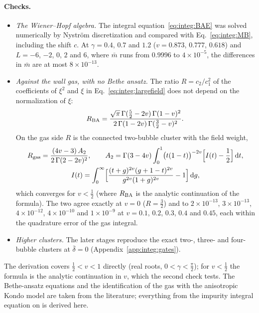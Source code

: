 \documentclass[11pt,a4paper]{article}
\numberwithin{equation}{section}
\newcommand{\dd}{\,\mathrm d}
\newcommand{\db}{\bar\delta}
\newcommand{\sci}[2]{#1\times10^{#2}}
\begin{document}
\paragraph{Checks.}
\begin{itemize}
\item \emph{The Wiener--Hopf algebra.} The integral equation~\eqref{eq:integ:BAE} was solved numerically by Nystr\"om
 discretization and compared with Eq.~\eqref{eq:integ:MB}, including the shift $c$. At $\gamma=0.4$, $0.7$ and $1.2$
 ($v=0.873$, $0.777$, $0.618$) and $L=-6$, $-2$, $0$, $2$ and $6$, where $\bar m$ runs from $0.9996$ to $\sci{4}{-5}$,
 the differences in $\bar m$ are at most $\sci{8}{-13}$.
\item \emph{Against the wall gas, with no Bethe ansatz.} The ratio $R=c_2/c_1^2$ of the coefficients of $\xi^2$ and
 $\xi$ in Eq.~\eqref{eq:integ:largefield} does not depend on the normalization of $\xi$:
 \begin{equation}
  R_{\rm BA}=\frac{\sqrt\pi\,\Gamma(\frac52-2v)\,\Gamma(1-v)^2}{2\,\Gamma(1-2v)\,\Gamma(\frac32-v)^2}.
 \end{equation}
 On the gas side $R$ is the connected two-bubble cluster with the field weight,
 \begin{equation}
 \begin{gathered}
  R_{\rm gas}=\frac{(4v-3)\,A_2}{2\,\Gamma(2-2v)^2},\qquad
  A_2=\Gamma(3-4v)\int_0^1\bigl(t(1-t)\bigr)^{-2v}\Bigl[I(t)-\frac12\Bigr]\dd t,\\
  I(t)=\int_0^\infty\Bigl[\frac{(t+g)^{2v}(g+1-t)^{2v}}{g^{2v}(1+g)^{2v}}-1\Bigr]\dd g,
 \end{gathered}
 \end{equation}
 which converges for $v<\frac12$ (where $R_{\rm BA}$ is the analytic continuation of the formula). The two agree
 exactly at $v=0$ ($R=\frac32$) and to $\sci{2}{-13}$, $\sci{3}{-13}$, $\sci{4}{-12}$, $\sci{4}{-10}$ and $\sci{1}{-9}$
 at $v=0.1$, $0.2$, $0.3$, $0.4$ and $0.45$, each within the quadrature error of the gas integral.
\item \emph{Higher clusters.} The later stages reproduce the exact two-, three- and four-bubble clusters at $\db=0$
 (Appendix~\ref{app:integ:gates}).
\end{itemize}
The derivation covers $\frac12<v<1$ directly (real roots, $0<\gamma<\frac\pi2$); for $v<\frac12$ the formula is the
analytic continuation in $v$, which the second check tests. The Bethe-ansatz equations and the identification of the
gas with the anisotropic Kondo model are taken from the literature; everything from the impurity integral equation
on is derived here.
\end{document}
